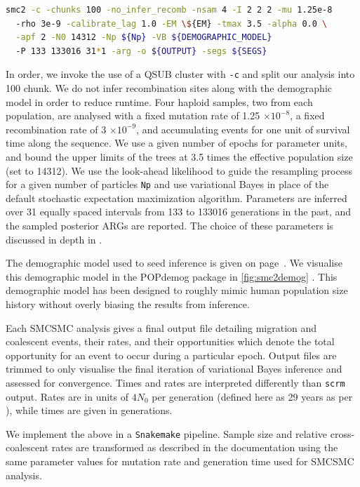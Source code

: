 \begin{lstlisting}[language=Bash]
smc2 -c -chunks 100 -no_infer_recomb -nsam 4 -I 2 2 2 -mu 1.25e-8 
  -rho 3e-9 -calibrate_lag 1.0 -EM \${EM} -tmax 3.5 -alpha 0.0 \
  -apf 2 -N0 14312 -Np ${Np} -VB ${DEMOGRAPHIC_MODEL} 
  -P 133 133016 31*1 -arg -o ${OUTPUT} -segs ${SEGS}
\end{lstlisting}

In order, we invoke the use of a QSUB cluster with {\tt -c} and split our analysis into 100 chunk. We do not infer recombination sites along with the demographic model in order to reduce runtime. Four haploid samples, two from each population, are analysed with a fixed mutation rate of 1.25 $\times 10^{-8}$, a fixed recombination rate of 3 $\times 10^{-9}$, and accumulating events for one unit of survival time along the sequence. We use a given number of epochs for parameter units, and bound the upper limits of the trees at 3.5 times the effective population size (set to 14312). We use the look-ahead likelihood to guide the resampling process for a given number of particles {\tt Np} and use variational Bayes in place of the default stochastic expectation maximization algorithm. Parameters are inferred over 31 equally spaced intervals from 133 to 133016 generations in the past, and the sampled posterior ARGs are reported. The choice of these parameters is discussed in depth in \cite{10.1371/journal.pone.0247647}. 

The demographic model used to seed inference is given on page~\pageref{app:dem_model:seed}. We visualise this demographic model in the POPdemog package in \autoref{fig:smc2demog} \cite{Zhou2018}. This demographic model has been designed to roughly mimic human population size history without overly biasing the results from inference. 

Each SMCSMC analysis gives a final output file detailing migration and coalescent events, their rates, and their opportunities which denote the total opportunity for an event to occur during a particular epoch. Output files are trimmed to only visualise the final iteration of variational Bayes inference and assessed for convergence. Times and rates are interpreted differently than {\tt scrm} output. Rates are in units of $4N_0$ per generation (defined here as 29 years as per \cite{Fenner2005}), while times are given in generations. 

We implement the above in a {\tt Snakemake} pipeline. Sample size and relative cross-coalescent rates are transformed as described in the documentation using the same parameter values for mutation rate and generation time used for SMCSMC analysis.


